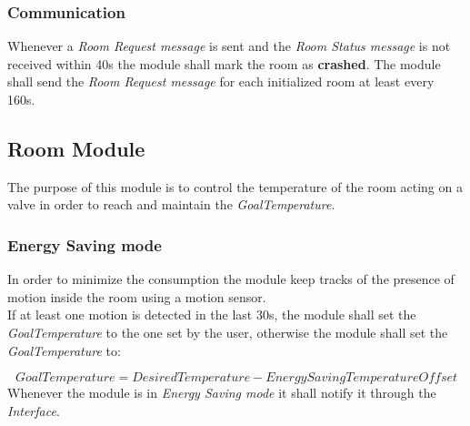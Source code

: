 \subsubsection{Communication}
Whenever a \textit{Room Request message} is sent and the \textit{Room Status message} is not received within 40s the module shall mark the room as \textbf{crashed}.
The module shall send the \textit{Room Request message} for each initialized room at least every 160s.

\subsection{Room Module}
The purpose of this module is to control the temperature of the room acting on a valve in order to 
reach and maintain the \textit{GoalTemperature}.

\subsubsection{Energy Saving mode}
In order to minimize the consumption the module keep tracks of the presence of motion inside the room
using a motion sensor. \\

If at least one motion is detected in the last 30s, the module shall set the \textit{GoalTemperature} to the one set by the user, otherwise the module shall set the \textit{GoalTemperature} to:

\begin{equation}
	GoalTemperature = DesiredTemperature - EnergySavingTemperatureOffset
\end{equation}
Whenever the module is in \textit{Energy Saving mode} it shall notify it through the \textit{Interface}.

